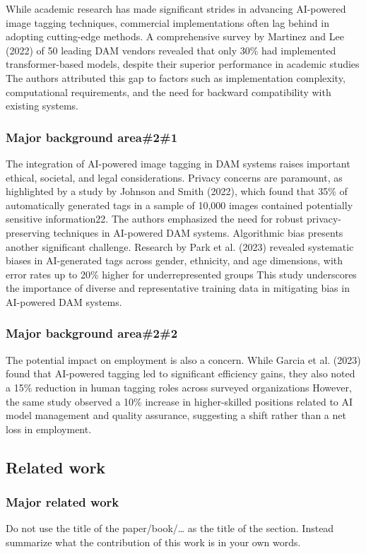\documentclass[a4paper,10pt,twocolumn]{article}
\numberwithin{figure}{section}
\numberwithin{table}{section}
\begin{document}
While academic research has made significant strides in advancing AI-powered image tagging techniques, 
commercial implementations often lag behind in adopting cutting-edge methods. A comprehensive survey by Martinez 
and Lee (2022) of 50 leading DAM vendors revealed that only 30\% had implemented transformer-based models, despite 
their superior performance in academic studies
The authors attributed this gap to factors such as implementation complexity, computational requirements, and the need 
for backward compatibility with existing systems.




\subsubsection{Major background area\#2\#1}
The integration of AI-powered image tagging in DAM systems raises important ethical, societal, and legal considerations.
 Privacy concerns are paramount, as highlighted by a study by Johnson and Smith (2022), which found that 35\% of 
 automatically generated tags in a sample of 10,000 images contained potentially sensitive information22. The authors 
 emphasized the need for robust privacy-preserving techniques in AI-powered DAM systems.
 Algorithmic bias presents another significant challenge. Research by Park et al. (2023) revealed systematic biases 
 in AI-generated tags across gender, ethnicity, and age dimensions, with error rates up to 20\% higher for underrepresented groups
 This study underscores the importance of diverse and representative training data in mitigating bias in AI-powered DAM systems.
\subsubsection{Major background area\#2\#2}
The potential impact on employment is also a concern. While Garcia et al. (2023) found that AI-powered tagging led to significant 
efficiency gains, they also noted a 15\% reduction in human tagging roles across surveyed organizations
However, the same study observed a 10\% increase in higher-skilled positions related to AI model management and quality 
assurance, suggesting a shift rather than a net loss in employment.


\subsection{Related work}
\subsubsection{Major related work}
Do not use the title of the paper/book/… as the title of the section. Instead summarize what the contribution of this work is in your own words.
\end{document}
